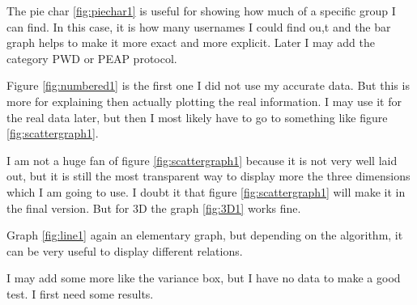 \documentclass[paper=a4, fontsize=11pt]{article}
\begin{document}
The pie char \ref{fig:piechar1} is useful for showing how much of a specific group I can find. In this case, it is how many usernames I could find ou,t and the bar graph helps to make it more exact and more explicit. Later I may add the category PWD or PEAP protocol.


Figure \ref{fig:numbered1} is the first one I did not use my accurate data. But this is more for explaining then actually plotting the real information. I may use it for the real data later, but then I most likely have to go to something like figure \ref{fig:scattergraph1}.


I am not a huge fan of figure \ref{fig:scattergraph1} because it is not very well laid out, but it is still the most transparent way to display more the three dimensions which I am going to use. I doubt it that  figure  \ref{fig:scattergraph1} will make it in the final version. But for 3D the graph \ref{fig:3D1} works fine.


Graph \ref{fig:line1} again an elementary graph, but depending on the algorithm, it can be very useful to display different relations.

I may add some more like the variance box, but I have no data to make a good test. I first need some results.
\end{document}
